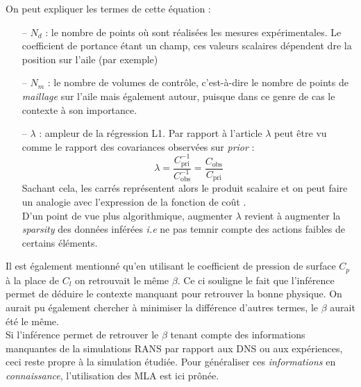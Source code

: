 \documentclass[a4paper,12pt]{report}
\newcommand{\cad}{c'est-à-dire}
\numberwithin{equation}{section} %
\begin{document}
\noindent On peut expliquer les termes de cette équation : 
\begin{itemize}[leftmargin=10mm]
\item[-- ] $N_d$ : le nombre de points où sont réalisées les mesures expérimentales. Le coefficient de portance étant un champ, ces valeurs scalaires dépendent dre la position sur l'aile (par exemple)
\item[-- ] $N_m$ : le nombre de volumes de contrôle, \cad $ $ le nombre de points de \textit{maillage} sur l'aile mais également autour, puisque dans ce genre de cas le contexte à son importance.
\item[-- ] $\lambda$ : ampleur de la régression L1. Par rapport à l'article \cite{parish2016paradigm} $\lambda$ peut être vu comme le rapport des covariances observées sur \textit{prior} : $$ \lambda = \frac{C_\text{pri}^{-1}}{C_\text{obs}^{-1}} = \frac{C_\text{obs}}{C_\text{pri}} $$ Sachant cela, les carrés représentent alors le produit scalaire et on peut faire un analogie avec l'expression de la fonction de coût \cite{parish2016paradigm}.\\
D'un point de vue plus algorithmique, augmenter $\lambda$ revient à augmenter la \textit{sparsity} des données inférées \textit{i.e} ne pas temnir compte des actions faibles de certains éléments.
\end{itemize}

\noindent Il est également mentionné qu'en utilisant le coefficient de pression de surface $C_p$ à la place de $C_l$ on retrouvait le même $\beta$. Ce ci souligne le fait que l'inférence permet de déduire le contexte manquant pour retrouver la bonne physique. On aurait pu également chercher à minimiser la différence d'autres termes, le $\beta$ aurait été le même.\\

\noindent Si l'inférence permet de retrouver le $\beta$ tenant compte des informations manquantes de la simulations RANS par rapport aux DNS ou aux expériences, ceci reste propre à la simulation étudiée. Pour généraliser ces \textit{informations} en \textit{connaissance}, l'utilisation des MLA est ici prônée.\\
\end{document}
